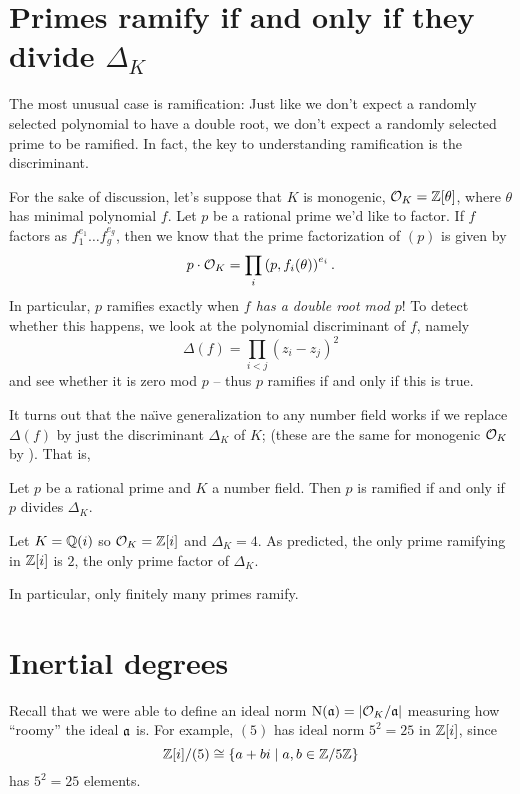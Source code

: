 \section{Primes ramify if and only if they divide $\Delta_K$}
The most unusual case is ramification:
Just like we don't expect a randomly selected polynomial to have a double root,
we don't expect a randomly selected prime to be ramified.
In fact, the key to understanding ramification is the discriminant.

For the sake of discussion, let's suppose that $K$ is monogenic,
$\mathcal O_K = \mathbb Z[\theta]$, where $\theta$ has minimal polynomial $f$.
Let $p$ be a rational prime we'd like to factor.
If $f$ factors as $f_1^{e_1} \dots f_g^{e_g}$, then we know that
the prime factorization of $(p)$ is given by
\[ p \cdot \mathcal O_K = \prod_i \left( p, f_i(\theta) \right)^{e_i}. \]
In particular, $p$ ramifies exactly when \emph{$f$ has a double root mod $p$}!
To detect whether this happens, we look at the polynomial discriminant of $f$,
namely
\[ \Delta(f) = \prod_{i<j} (z_i - z_j)^2 \]
and see whether it is zero mod $p$ -- thus $p$ ramifies if and only if this is true.

It turns out that the na\"{\i}ve generalization to any number field
works if we replace $\Delta(f)$ by just the discriminant $\Delta_K$ of $K$;
(these are the same for monogenic $\mathcal O_K$ by ).
That is,
\begin{theorem}
	Let $p$ be a rational prime and $K$ a number field.
	Then $p$ is ramified if and only if $p$ divides $\Delta_K$.
\end{theorem}
\begin{example}
	Let $K = \mathbb Q(i)$ so $\mathcal O_K = \mathbb Z[i]$ and $\Delta_K = 4$.
	As predicted, the only prime ramifying in $\mathbb Z[i]$ is $2$,
	the only prime factor of $\Delta_K$.
\end{example}
In particular, only finitely many primes ramify.

\section{Inertial degrees}

Recall that we were able to define an ideal norm
$\operatorname{N}(\mathfrak a) = \left\lvert \mathcal O_K / \mathfrak a \right\rvert$
measuring how ``roomy'' the ideal $\mathfrak a$ is.
For example, $(5)$ has ideal norm $5^2 = 25$ in $\mathbb Z[i]$, since
\[ \mathbb Z[i] / (5) \cong \left\{ a+bi \mid a,b \in \mathbb Z/5\mathbb Z \right\} \]
has $5^2 = 25$ elements.

